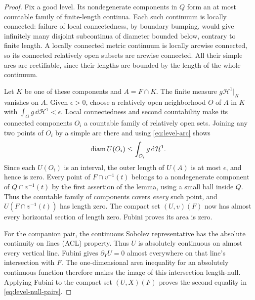 \begin{proof}
Fix a good level. Its nondegenerate components in $Q$ form an at most
countable family of finite-length continua. Each such continuum is
locally connected: failure of local connectedness, by boundary
bumping, would give infinitely many disjoint subcontinua of diameter
bounded below, contrary to finite length. A locally connected metric
continuum is locally arcwise connected, so its connected relatively
open subsets are arcwise connected. All their simple arcs are
rectifiable, since their lengths are bounded by the length of the
whole continuum.

Let $K$ be one of these components and $A=F\cap K$. The finite measure
$g\mathcal H^1|_K$ vanishes on $A$. Given $\epsilon>0$, choose a
relatively open neighborhood $O$ of $A$ in $K$ with
$\int_Og\,\dd\mathcal H^1<\epsilon$. Local connectedness and second
countability make its connected components $O_i$ a countable family
of relatively open sets. Joining any two points of $O_i$ by a simple
arc there and using \eqref{eq:level-arc} shows
\[
 \operatorname{diam} U(O_i)\le\int_{O_i}g\,\mathrm d\mathcal H^1.
\]
Since each $U(O_i)$ is an interval, the outer length of $U(A)$ is at
most $\epsilon$, and hence is zero. Every point of
$F\cap v^{-1}(t)$ belongs to a nondegenerate component of
$Q\cap v^{-1}(t)$ by the first assertion of the lemma, using a small
ball inside $Q$. Thus the countable family of components covers
\emph{every} such point, and $U(F\cap v^{-1}(t))$ has length zero.
The compact set $(U,v)(F)$ now has almost every horizontal section of
length zero. Fubini proves its area is zero.

For the companion pair, the continuous Sobolev representative has the
absolute continuity on lines (ACL) property. Thus $U$ is absolutely
continuous on almost every
vertical line. Fubini gives $\partial_YU=0$ almost everywhere on that
line's intersection with $F$. The one-dimensional area inequality for
an absolutely continuous function therefore makes the image of this
intersection length-null. Applying Fubini to the compact set
$(U,X)(F)$ proves the second equality in
\eqref{eq:level-null-pairs}.
\end{proof}
